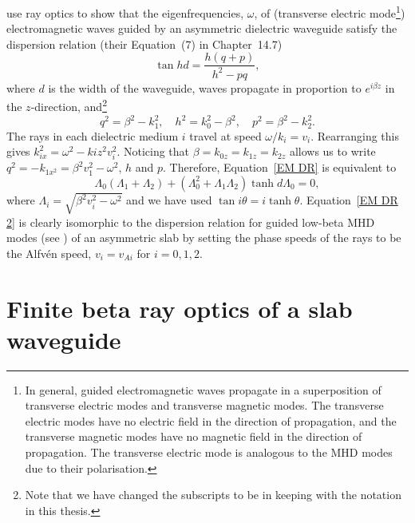 \documentclass[12pt]{../style-files/ociamthesis}
\begin{document}
	\cite{ram_etal84} use ray optics to show that the eigenfrequencies, $\omega$, of (transverse electric mode\footnote{In general, guided electromagnetic waves propagate in a superposition of transverse electric modes and transverse magnetic modes. The transverse electric modes have no electric field in the direction of propagation, and the transverse magnetic modes have no magnetic field in the direction of propagation. The transverse electric mode is analogous to the MHD modes due to their polarisation.}) electromagnetic waves guided by an asymmetric dielectric waveguide satisfy the dispersion relation (their Equation~(7) in Chapter~14.7)
	\begin{equation}
	\tan{hd} = \frac{h(q + p)}{h^2 - pq}, \label{EM DR}
	\end{equation}
	where $d$ is the width of the waveguide, waves propagate in proportion to $e^{i\beta z}$ in the $z$-direction, and\footnote{Note that we have changed the subscripts to be in keeping with the notation in this thesis.} 
	\begin{equation}
	q^2 = \beta^2 - k_1^2, \quad h^2 = k_0^2 - \beta^2, \quad p^2 = \beta^2 - k_2^2.
	\end{equation}
	The rays in each dielectric medium $i$ travel at speed $\omega/k_i = v_i$. Rearranging this gives $k_{ix}^2 = \omega^2 - k{iz}^2 v_i^2$. Noticing that $\beta = k_{0z} = k_{1z} = k_{2z}$ allows us to write $q^2 = -k_{1x^2} = \beta^2 v_1^2 - \omega^2$, $h$ and $p$. Therefore, Equation~\eqref{EM DR} is equivalent to
	\begin{equation}
	\Lambda_0(\Lambda_1 + \Lambda_2) + (\Lambda_0^2 + \Lambda_1\Lambda_2)\tanh{d\Lambda_0} = 0, \label{EM DR 2}
	\end{equation}
	where $\Lambda_i = \sqrt{\beta^2v_i^2 - \omega^2}$ and we have used $\tan{i\theta} = i \tanh{\theta}$. Equation~\eqref{EM DR 2} is clearly isomorphic to the dispersion relation for guided low-beta MHD modes (see \citealp{all_etal17}) of an asymmetric slab by setting the phase speeds of the rays to be the Alfv\'{e}n speed, $v_i = v_{Ai}$ for $i = 0, 1, 2$.
	
	
	\section{Finite beta ray optics of a slab waveguide}
	\label{sec: finite beta}
	
\end{document}
